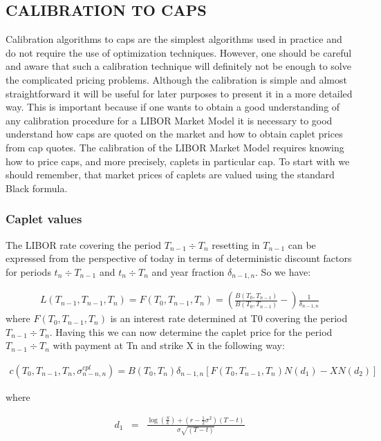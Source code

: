 \documentclass[11pt]{article}
\numberwithin{equation}{subsection}
\begin{document}
\subsection{CALIBRATION TO CAPS}
Calibration algorithms to caps are the simplest algorithms used in practice and do not
require the use of optimization techniques. However, one should be careful and aware that
such a calibration technique will definitely not be enough to solve the complicated pricing
problems. Although the calibration is simple and almost straightforward it will be useful for
later purposes to present it in a more detailed way. This is important because if one wants to
obtain a good understanding of any calibration procedure for a LIBOR Market Model it is
necessary to good understand how caps are quoted on the market and how to obtain caplet
prices from cap quotes.
The calibration of the LIBOR Market Model requires knowing how to price caps, and
more precisely, caplets in particular cap. To start with we should remember, that market
prices of caplets are valued using the standard Black formula.
\subsubsection{Caplet values}
The LIBOR rate covering the period \(T_{n−1}÷T_{n}\) resetting in \(T_{n−1}\) can be expressed from the
perspective of today in terms of deterministic discount factors for periods \(t_n÷T_{n-1}\) and \(t_n÷T_{n}\)
and year fraction \(\delta_{n−1,n}\). So we have:

\begin{eqnarray*}
	L(T_{n-1}, T_{n-1}, T_{n}) = F(T_{0}, T_{n-1}, T_{n}) = (\frac{B(T_0, T_{n-1})}{B(T_0, T_{n-1})} -)\frac{1}{\delta_{n−1,n}}
\end{eqnarray*}
where \(F(T_{0}, T_{n-1}, T_{n})\) is an interest rate determined at T0 covering the period  \(T_{n−1}÷T_{n}\).
Having this we can now determine the caplet price for the period \(T_{n−1}÷T_{n}\) with payment at Tn and strike X in the following way:

\begin{eqnarray*}
	c(T_{0}, T_{n-1}, T_{n}, \sigma_{n-n, n}^{cpl}) = B(T_0, T_{n}) \delta_{n−1,n} [F(T_{0}, T_{n-1}, T_{n})N(d_1)-XN(d_2)]
\end{eqnarray*}

where 

\begin{eqnarray*}
	d_1&=&\frac{\log(\frac{S}{k})+(r-\frac{1}{2}\sigma^2)(T-t)}{\sigma\sqrt{(T-t)}}
\end{eqnarray*}
\end{document}
